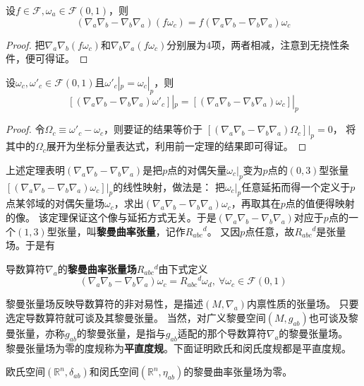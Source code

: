 \begin{theorem}
设$f \in \mathscr{F}, \omega_a \in \mathscr{F}(0, 1)$，则
$$(\nabla_a\nabla_b - \nabla_b\nabla_a)(f\omega_c) = f(\nabla_a\nabla_b - \nabla_b\nabla_a)\omega_c$$
\end{theorem}

\begin{proof}
把$\nabla_a\nabla_b(f\omega_c)$和$\nabla_b\nabla_a(f\omega_c)$分别展为$4$项，两者相减，注意到无挠性条件，便可得证。
\end{proof}

\begin{theorem}
设$\omega_c, \omega'_c \in \mathscr{F}(0, 1)$且$\omega'_c|_p = \omega_c|_p$，则
$$[(\nabla_a\nabla_b - \nabla_b\nabla_a)\omega'_c]|_p = [(\nabla_a\nabla_b - \nabla_b\nabla_a)\omega_c]|_p$$
\end{theorem}

\begin{proof}
令$\Omega_c \equiv \omega'_c - \omega_c$，则要证的结果等价于
$[(\nabla_a\nabla_b - \nabla_b\nabla_a)\Omega_c]|_p = 0$，
将其中的$\Omega_c$展开为坐标分量表达式，利用前一定理的结果即可得证。
\end{proof}

上述定理表明$(\nabla_a\nabla_b - \nabla_b\nabla_a)$是把$p$点的对偶矢量$\omega_c|_p$变为$p$点的$(0, 3)$型张量$[(\nabla_a\nabla_b - \nabla_b\nabla_a)\omega_c]|_p$的线性映射，做法是：
把$\omega_c|_p$任意延拓而得一个定义于$p$点某邻域的对偶矢量场$\omega_c$，求出$(\nabla_a\nabla_b - \nabla_b\nabla_a)\omega_c$，再取其在$p$点的值便得映射的像。
该定理保证这个像与延拓方式无关。于是$(\nabla_a\nabla_b - \nabla_b\nabla_a)$对应于$p$点的一个$(1, 3)$型张量，叫\textbf{黎曼曲率张量}，记作$R_{abc}{}^d$。
又因$p$点任意，故$R_{abc}{}^d$是张量场。于是有

\begin{definition}
导数算符$\nabla_a$的\textbf{黎曼曲率张量场}$R_{abc}{}^d$由下式定义
$$(\nabla_a\nabla_b - \nabla_b\nabla_a)\omega_c = R_{abc}{}^d\omega_d, ~ \forall \omega_c \in \mathscr{F}(0, 1)$$
\end{definition}

黎曼张量场反映导数算符的非对易性，是描述$(M, \nabla_a)$内禀性质的张量场。
只要选定导数算符就可谈及其黎曼张量。
当然，对广义黎曼空间$(M, g_{ab})$也可谈及黎曼张量，亦称$g_{ab}$的黎曼张量，是指与$g_{ab}$适配的那个导数算符$\nabla_a$的黎曼张量场。
黎曼张量场为零的度规称为\textbf{平直度规}。下面证明欧氏和闵氏度规都是平直度规。

\begin{theorem}
欧氏空间$(\mathbb{R}^n, \delta_{ab})$和闵氏空间$(\mathbb{R}^n, \eta_{ab})$的黎曼曲率张量场为零。
\end{theorem}


